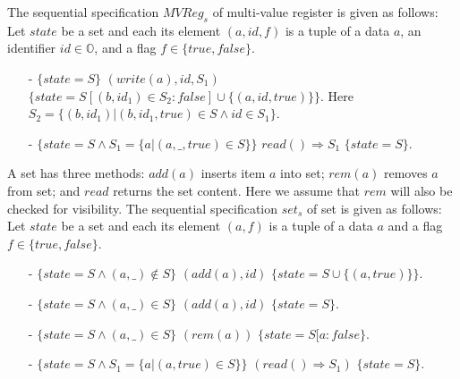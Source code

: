 \begin{example}
\label{def:spec-MVR}
The sequential specification $\mathit{MVReg}_s$ of multi-value
register is given as follows: Let $\mathit{state}$ be a set and each
its element $(a,\mathit{id},f)$ is a tuple of a data $a$, an
identifier $\mathit{id} \in \mathbb{O}$, and a flag $f \in \{
\mathit{true},\mathit{false} \}$.
\begin{itemize}
\setlength{\itemsep}{0.5pt}
\item[-] $\{ \mathit{state} = S \}$ $(write(a),\mathit{id},S_1)$ $\{
  \mathit{state} = S[(b,\mathit{id}_1) \in S_2 : \mathit{false}] \cup
  \{ (a,id,\mathit{true}) \} \}$. Here $S_2 = \{ (b,\mathit{id}_1)
  \vert (b,\mathit{id}_1,\mathit{true}) \in S \wedge id \in S_1 \}$.
\item[-] $\{ \mathit{state} = S \wedge S_1 = \{ a \vert
  (a,\_,\mathit{true}) \in S \} \}$ $read() \Rightarrow S_1$ $\{
  \mathit{state} = S \}$.
\end{itemize}
\end{example}

\begin{example}
\label{definition:sequential specification of set}
A set has three methods: $\mathit{add}(a)$ inserts item $a$ into set;
$\mathit{rem}(a)$ removes $a$ from set; and $\mathit{read}$ returns
the set content.
Here we assume that $\mathit{rem}$ will also be checked for
visibility.
The sequential specification $\mathit{set}_s$ of set is given as
follows:  Let $\mathit{state}$ be a set and each its element $(a,f)$
is a tuple of a data $a$ and a flag $f \in \{ \mathit{true},\mathit{false} \}$.
\begin{itemize}
\setlength{\itemsep}{0.5pt}
\item[-] $\{ \mathit{state} = S \wedge (a,\_) \notin S \}$
  $(\mathit{add}(a),\mathit{id})$ $\{ \mathit{state} = S \cup \{
  (a,\mathit{true}) \} \}$.
\item[-] $\{ \mathit{state} = S \wedge (a,\_) \in S \}$
  $(\mathit{add}(a),\mathit{id})$ $\{ \mathit{state} = S \}$.
\item[-] $\{ \mathit{state} = S \wedge (a,\_) \in S \}$
  $(\mathit{rem}(a))$ $\{ \mathit{state} = S[a: \mathit{false} \}$.
\item[-] $\{ \mathit{state} = S \wedge S_1 = \{a \vert
  (a,\mathit{true}) \in S \} \}$ $(\mathit{read}() \Rightarrow S_1)$
  $\{ \mathit{state} = S \}$.
\end{itemize}
\end{example}


